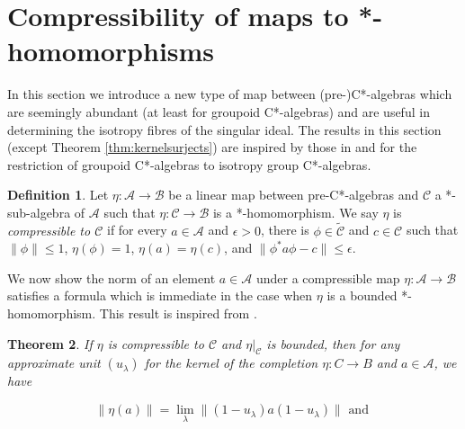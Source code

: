\documentclass[a4paper, 12pt]{amsart}
\newtheorem{thm}{Theorem}[section]
\theoremstyle{definition}
\newtheorem{dfn}[thm]{Definition}
\theoremstyle{remark}
\numberwithin{equation}{section}
\begin{document}
\section{Compressibility of maps to *-homomorphisms}
\label{s:compress}
In this section we introduce a new type of map between (pre-)C*-algebras which are seemingly abundant (at least for groupoid C*-algebras) and are useful in determining the isotropy fibres of the singular ideal. The results in this section (except Theorem \ref{thm:kernelsurjects}) are inspired by those in \cite{CN22} and \cite{CN24} for the restriction of groupoid C*-algebras to isotropy group C*-algebras.

\begin{dfn}
\label{dfn:comp}
    Let $\eta:\mathcal{A}\to\mathcal{B}$ be a linear map between pre-C*-algebras and $\mathcal{C}$ a *-sub-algebra of $\mathcal{A}$ such that $\eta:\mathcal{C}\to\mathcal{B}$ is a *-homomorphism. We say $\eta$ is \emph{compressible to $\mathcal{C}$} if for every $a\in\mathcal{A}$ and $\epsilon > 0$, there is $\phi\in\widetilde{\mathcal{C}}$ and  $c\in\mathcal{C}$ such that $\|\phi\|\leq 1$, $\eta(\phi) = 1$, $\eta(a) = \eta(c)$, and $\|\phi^{*} a\phi  - c\|\leq \epsilon$.
\end{dfn}

We now show the norm of an element $a\in\mathcal{A}$ under a compressible map $\eta:\mathcal{A}\to\mathcal{B}$ satisfies a formula which is immediate in the case when $\eta$ is a bounded *-homomorphism. This result is inspired from \cite[Theorem~2.4]{CN22}.
\begin{thm}
\label{thm:normeqn}
If $\eta$ is compressible to $\mathcal{C}$ and $\eta|_{\mathcal{C}}$ is bounded, then for any approximate unit $(u_{\lambda})$ for the kernel of the completion $\eta: C\to B$ and $a\in\mathcal{A}$, we have

\begin{equation}
\label{eq:norm1}
    \|\eta(a)\| = \lim_{\lambda}\|(1-u_{\lambda})a(1-u_{\lambda})\|\text{ and }
\end{equation}

\end{thm}
\end{document}
